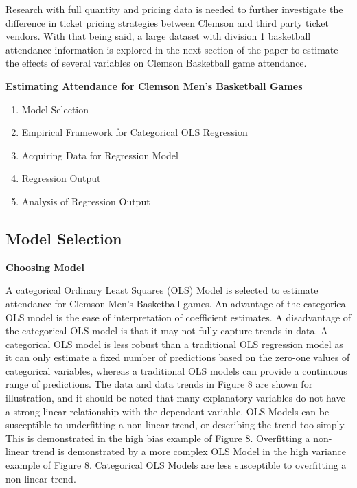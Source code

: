 \documentclass[preprint,12pt,times]{elsarticle}
\begin{document}
Research with full quantity and pricing data is needed to further investigate the difference in ticket pricing strategies between Clemson and third party ticket vendors.  With that being said, a large dataset with division 1 basketball attendance information is explored in the next section of the paper to estimate the effects of several variables on Clemson Basketball game attendance.\\

\begin{Large}
\noindent\textbf{\ul{Estimating Attendance for Clemson Men's Basketball Games}}
\end{Large}
\begin{large}
\begin{enumerate}
  \item Model Selection
  \item Empirical Framework for Categorical OLS Regression
  \item Acquiring Data for Regression Model
  \item Regression Output
  \item Analysis of Regression Output
\end{enumerate}
\end{large}

\begin{large}
\setcounter{section}{0}\section{\textbf{Model Selection}}
\end{large}
\noindent
\textbf{Choosing Model}

A categorical Ordinary Least Squares (OLS) Model is selected to estimate attendance for Clemson Men's Basketball games.  An advantage of the categorical OLS model is the ease of interpretation of coefficient estimates.  A disadvantage of the categorical OLS model is that it may not fully capture trends in data.  A categorical OLS model is less robust than a traditional OLS regression model as it can only estimate a fixed number of predictions based on the zero-one values of categorical variables, whereas a traditional OLS models can provide a continuous range of predictions.  The data and data trends in Figure 8 are shown for illustration, and it should be noted that many explanatory variables do not have a strong linear relationship with the dependant variable.  OLS Models can be susceptible to underfitting a non-linear trend, or describing the trend too simply.  This is demonstrated in the high bias example of Figure 8.  Overfitting a non-linear trend is demonstrated by a more complex OLS Model in the high variance example of Figure 8.  Categorical OLS Models are less susceptible to overfitting a non-linear trend.  
\end{document}
